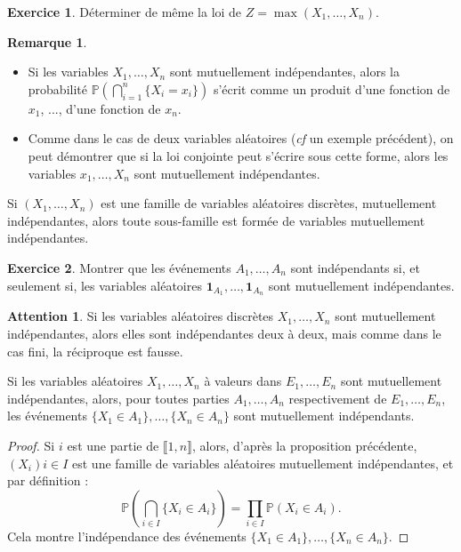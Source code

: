 \documentclass[french]{article}
\renewcommand{\P}{\mathbb{P}}
\theoremstyle{plain}
\theoremstyle{definition}
\newtheorem{exo}{Exercice}
\newtheorem*{rmq}{Remarque}
\newtheorem*{attention}{Attention}
\theoremstyle{remark}
\begin{document}
\begin{exo}
	Déterminer de même la loi de $Z=\max(X_1,\ldots,X_n)$.
\end{exo}

\begin{rmq}
	\begin{itemize}
		\item Si les variables $X_1,\ldots,X_n$ sont mutuellement indépendantes, alors la probabilité $\P\displaystyle\left(\bigcap_{i=1}^n\{X_i=x_i\}\right)$ s'écrit comme un produit d'une fonction de $x_1$, ..., d'une fonction de $x_n$.
		\item Comme dans le cas de deux variables aléatoires (\textit{cf} un exemple précédent), on peut démontrer que si la loi conjointe peut s'écrire sous cette forme, alors les variables $x_1,\ldots,X_n$ sont mutuellement indépendantes.
	\end{itemize}
\end{rmq}

\begin{thm}{}%
	Si $(X_1,\ldots,X_n)$ est une famille de variables aléatoires discrètes, mutuellement indépendantes, alors toute sous-famille est formée de variables mutuellement indépendantes.
\end{thm}

\begin{exo}
	Montrer que les événements $A_1,\ldots,A_n$ sont indépendants si, et seulement si, les variables aléatoires $\textbf{1}_{A_1},\ldots,\textbf{1}_{A_n}$ sont mutuellement indépendantes.
\end{exo}

\begin{attention}
	Si les variables aléatoires discrètes $X_1,\ldots,X_n$ sont mutuellement indépendantes, alors elles sont indépendantes deux à deux, mais comme dans le cas fini, la réciproque est fausse.
\end{attention}

\begin{thm}{}%
	Si les variables aléatoires $X_1,\ldots,X_n$ à valeurs dans $E_1,\ldots,E_n$ sont mutuellement indépendantes, alors, pour toutes parties $A_1,\ldots,A_n$ respectivement de $E_1,\ldots,E_n$, les événements $\{X_1\in A_1\},\ldots,\{X_n\in A_n\}$ sont mutuellement indépendants.
\end{thm}
\begin{proof}
	Si $i$ est une partie de $\llbracket1,n\rrbracket$, alors, d'après la proposition précédente, $(X_i){i\in I}$ est une famille de variables aléatoires mutuellement indépendantes, et par définition :
	$$\P\left(\bigcap_{i\in I}\{X_i\in A_i\}\right)=\prod_{i\in I}\P(X_i\in A_i).$$ Cela montre l'indépendance des événements $\{X_1\in A_1\},\ldots,\{X_n\in A_n\}$.
\end{proof}
\end{document}
